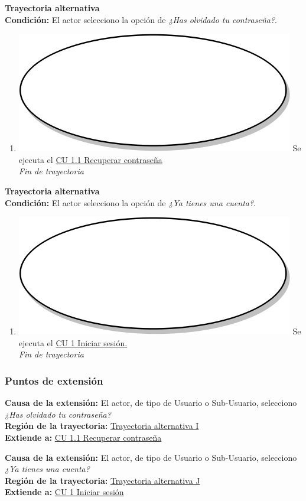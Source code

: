 \textbf{Trayectoria alternativa } \label{cu2_ta_}\\
\textbf{Condición:} El actor selecciono la opción de \textit{¿Has olvidado tu contraseña?}.\\
 \begin{enumerate}[label=\arabic*]
    \item {\includegraphics[scale=.05]{Capitulo3/img/proceso.png} Se ejecuta el \hyperref[cu1_1]{CU 1.1 Recuperar contraseña}} \\
    \textit{Fin de trayectoria} \\
\end{enumerate}

\textbf{Trayectoria alternativa } \label{cu2_ta_}\\
\textbf{Condición:} El actor selecciono la opción de \textit{¿Ya tienes una cuenta?}.\\
 \begin{enumerate}[label=\arabic*]
    \item {\includegraphics[scale=.05]{Capitulo3/img/proceso.png} Se ejecuta el \hyperref[cu1]{CU 1 Iniciar sesión.}}\\
    \textit{Fin de trayectoria} \\
\end{enumerate}

\subsubsection{Puntos de extensión}
\noindent \textbf{Causa de la extensión:} El actor, de tipo de Usuario o Sub-Usuario, selecciono \textit{¿Has olvidado tu contraseña?} \\
\textbf{Región de la trayectoria:} \hyperref[cu2_ta_i]{Trayectoria alternativa I} \\
\textbf{Extiende a:} \hyperref[cu1_1]{CU 1.1 Recuperar contraseña} \\ \par

\noindent \textbf{Causa de la extensión:} El actor, de tipo de Usuario o Sub-Usuario, selecciono \textit{¿Ya tienes una cuenta?} \\
\textbf{Región de la trayectoria:} \hyperref[cu2_ta_j]{Trayectoria alternativa J} \\
\textbf{Extiende a:} \hyperref[cu1]{CU 1 Iniciar sesión}
